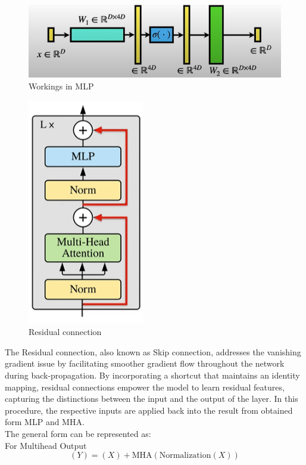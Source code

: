 \begin{figure}[htbp]
    \centering
    \includegraphics[width=5.5in]{img/MLP workings.png}
    \caption{{Workings in MLP}}
\end{figure}
\newpage
\begin{figure}[htbp]
    \centering
    \includegraphics[width=2in]{img/residual connection.png}
    \caption{{Residual connection}}
\end{figure}
The Residual connection, also known as Skip connection, addresses the vanishing gradient issue by facilitating smoother gradient flow throughout the network during back-propagation. By incorporating a shortcut that maintains an identity mapping, residual connections empower the model to learn residual features, capturing the distinctions between the input and the output of the layer. In this procedure, the respective inputs are applied back into the result from obtained form MLP and MHA.\\

The general form can be represented as:\\

For Multihead Output\\
\begin{equation}
    (Y) = (X) + \text{MHA} (\text{Normalization} (X)) \label{eq:multihead_output}
\end{equation}


